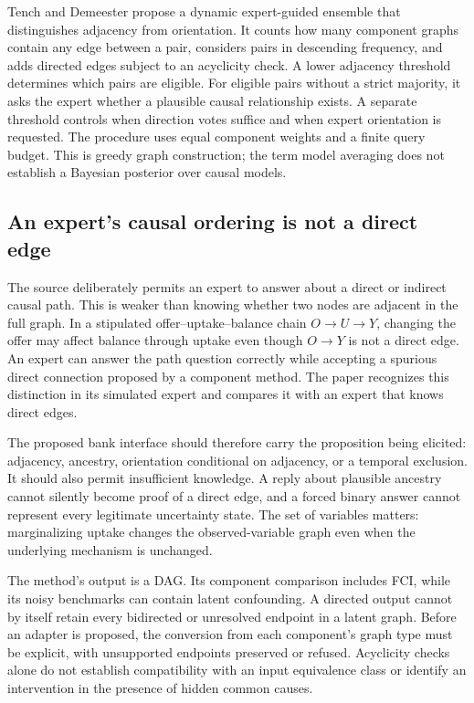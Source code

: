 Tench and Demeester propose a dynamic expert-guided ensemble that distinguishes
adjacency from orientation. It counts how many component graphs contain any
edge between a pair, considers pairs in descending frequency, and adds directed
edges subject to an acyclicity check. A lower adjacency threshold determines
which pairs are eligible. For eligible pairs without a strict majority, it asks
the expert whether a plausible causal relationship exists. A separate threshold
controls when direction votes suffice and when expert orientation is requested.
The procedure uses equal component weights and a finite query budget. This is
greedy graph construction; the term model averaging does not establish a
Bayesian posterior over causal models. \citep{exec20_expert_averaging}

\subsection{An expert's causal ordering is not a direct edge}
\label{exec20:expert-semantics}

The source deliberately permits an expert to answer about a direct or indirect
causal path. This is weaker than knowing whether two nodes are adjacent in the
full graph. In a stipulated offer--uptake--balance chain
$O\rightarrow U\rightarrow Y$, changing the offer may affect balance through
uptake even though $O\rightarrow Y$ is not a direct edge. An expert can answer
the path question correctly while accepting a spurious direct connection
proposed by a component method. The paper recognizes this distinction in its
simulated expert and compares it with an expert that knows direct edges.
\citep{exec20_expert_averaging,exec20_expert_averaging_reference}

The proposed bank interface should therefore carry the proposition being
elicited: adjacency, ancestry, orientation conditional on adjacency, or a
temporal exclusion. It should also permit insufficient knowledge. A reply about
plausible ancestry cannot silently become proof of a direct edge, and a forced
binary answer cannot represent every legitimate uncertainty state. The set of
variables matters: marginalizing uptake changes the observed-variable graph
even when the underlying mechanism is unchanged.

The method's output is a DAG. Its component comparison includes FCI, while its
noisy benchmarks can contain latent confounding. A directed output cannot by
itself retain every bidirected or unresolved endpoint in a latent graph. Before
an adapter is proposed, the conversion from each component's graph type must be
explicit, with unsupported endpoints preserved or refused. Acyclicity checks
alone do not establish compatibility with an input equivalence class or identify
an intervention in the presence of hidden common causes.
\citep{exec20_expert_averaging}

